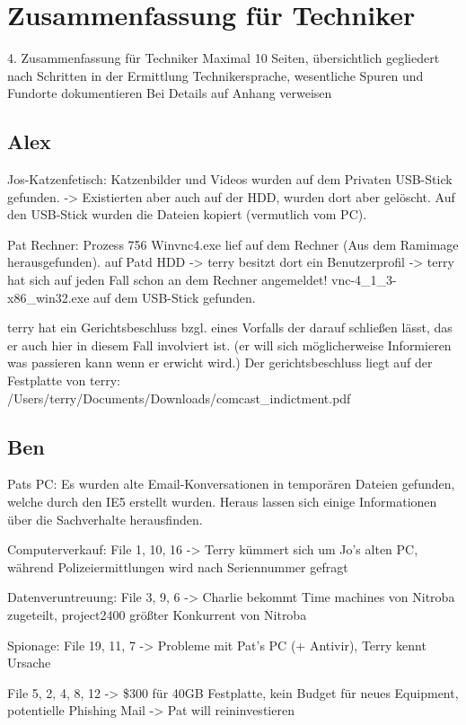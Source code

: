 \chapter{Zusammenfassung für Techniker}
\label{sec:tec}


4. Zusammenfassung für Techniker
Maximal 10 Seiten, übersichtlich gegliedert nach Schritten in der Ermittlung
Technikersprache, wesentliche Spuren und Fundorte dokumentieren
Bei Details auf Anhang verweisen

\section{Alex}
Jos-Katzenfetisch:
Katzenbilder und Videos wurden auf dem Privaten USB-Stick gefunden. -> Existierten aber auch auf der HDD, wurden dort aber gelöscht.
Auf den USB-Stick wurden die Dateien kopiert (vermutlich vom PC).

Pat Rechner:
Prozess 756 Winvnc4.exe lief auf dem Rechner (Aus dem Ramimage herausgefunden).
auf Patd HDD -> terry besitzt dort ein Benutzerprofil -> terry hat sich auf jeden Fall schon an dem Rechner angemeldet!
  vnc-4_1_3-x86_win32.exe auf dem USB-Stick gefunden.

terry hat ein Gerichtsbeschluss bzgl. eines Vorfalls der darauf schließen lässt, das er auch hier in diesem Fall involviert ist. (er will sich möglicherweise Informieren was passieren kann wenn er erwicht wird.)
Der gerichtsbeschluss liegt auf der Festplatte von terry:
/Users/terry/Documents/Downloads/comcast_indictment.pdf

\section{Ben}
Pats PC:
Es wurden alte Email-Konversationen in temporären Dateien gefunden, welche durch den IE5 erstellt wurden.
Heraus lassen sich einige Informationen über die Sachverhalte herausfinden.

Computerverkauf:
File 1, 10, 16 -> Terry kümmert sich um Jo's alten PC, während Polizeiermittlungen wird nach Seriennummer gefragt

Datenveruntreuung:
File 3, 9, 6 -> Charlie bekommt Time machines von Nitroba zugeteilt, project2400 größter Konkurrent von Nitroba

Spionage:
File 19, 11, 7 -> Probleme mit Pat's PC (+ Antivir), Terry kennt Ursache

File 5, 2, 4, 8, 12 -> \$300 für 40GB Festplatte, kein Budget für neues Equipment, potentielle Phishing Mail -> Pat will reininvestieren